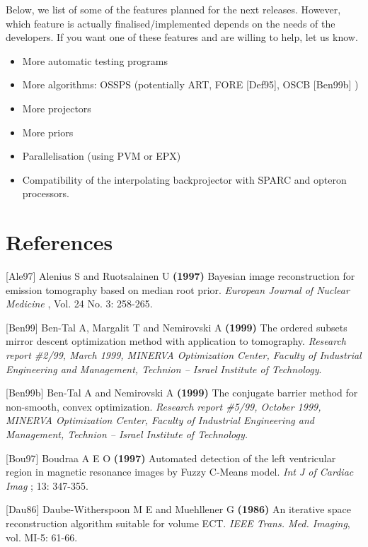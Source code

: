 \documentclass{article}
\begin{document}
Below, we list of some of the features planned for the next releases. 
However, which feature is actually finalised/implemented depends 
on the needs of the developers. If you want one of these features 
and are willing to help, let us know.
\begin{itemize}
\item
More automatic testing programs
\item
More algorithms: OSSPS (potentially ART, FORE [Def95], 
OSCB [Ben99b] )
\item
More projectors
\item
More priors
\item
Parallelisation (using PVM or EPX)
\item
Compatibility of the interpolating backprojector with SPARC and opteron 
processors.
\end{itemize}





\section{
References}

{[}Ale97] Alenius S and Ruotsalainen U \textbf{(1997)} Bayesian image 
reconstruction for emission tomography based on median root prior. \textit{European 
Journal of Nuclear Medicine} , Vol. 24 No. 3: 258-265.


{[}Ben99] Ben-Tal A, Margalit T and Nemirovski A \textbf{(1999)} The 
ordered subsets mirror descent optimization method with application 
to tomography. \textit{Research report \#2/99, March 1999, MINERVA 
Optimization Center, Faculty of Industrial Engineering and Management, 
Technion -- Israel Institute of Technology}.

{[}Ben99b] Ben-Tal A and Nemirovski A \textbf{(1999)} The conjugate 
barrier method for non-smooth, convex optimization. \textit{Research 
report \#5/99, October 1999, MINERVA Optimization Center, Faculty 
of Industrial Engineering and Management, Technion -- Israel Institute 
of Technology.}


{[}Bou97] Boudraa \textsc{A E O} \textbf{(1997)} Automated detection of the 
left ventricular region in magnetic resonance images by Fuzzy 
C-Means model. \textit{Int J of Cardiac Imag} ; 13: 347-355.

{[}Dau86] Daube-Witherspoon M E and Muehllener G \textbf{(1986)} An 
iterative space reconstruction algorithm suitable for volume 
ECT. \textit{IEEE Trans. Med. Imaging}, vol. MI-5: 61-66.
\end{document}
